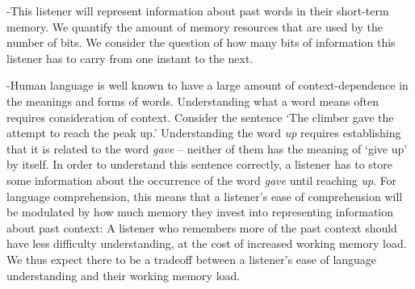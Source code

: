 \documentclass[11pt,letterpaper]{article}
\newcommand{\jd}[1]{\textcolor{Red}{[jd: #1]}}
\begin{document}
-This listener will represent information about past words in their short-term memory.
We quantify the amount of memory resources that are used by the number of bits.
We consider the question of how many bits of information this listener has to carry from one instant to the next.  %

-Human language is well known to have a large amount of context-dependence in the meanings and forms of words.
Understanding what a word means often requires consideration of context. 
Consider the sentence `The climber gave the attempt to reach the peak up.'
Understanding the word \emph{up} requires establishing that it is related to the word \emph{gave} -- neither of them has the meaning of `give up' by itself.
In order to understand this sentence correctly, a listener has to store some information about the occurrence of the word \emph{gave} until reaching \emph{up}.
For language comprehension, this means that a listener's ease of comprehension will be modulated by how much memory they invest into representing information about past context:
A listener who remembers more of the past context should have less difficulty understanding, at the cost of increased working memory load. 
We thus expect there to be a tradeoff between a listener's ease of language understanding and their working memory load.



%



\end{document}
